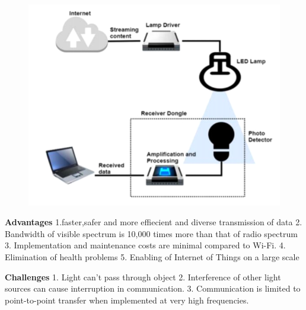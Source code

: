 \documentclass[a0paper,portrait]{baposter}
\begin{document}
\begin{poster}
{\begin{figure}
	{\includegraphics[scale=0.15]{Lifi}}
\end{figure}                                             
 \textbf{Advantages} 1.faster,safer and more effiecient and diverse transmission of data 2. Bandwidth of visible spectrum is 10,000 times more than that of radio spectrum 3. Implementation and maintenance costs are minimal compared to Wi-Fi. 4.	Elimination of health problems 5. Enabling of Internet of Things on a large scale



\textbf{Challenges} 1. Light can’t pass through object  2. Interference of other light sources can cause interruption in communication. 3. Communication is limited to point-to-point transfer when implemented at very  high frequencies.



}

\end{poster}
\end{document}
